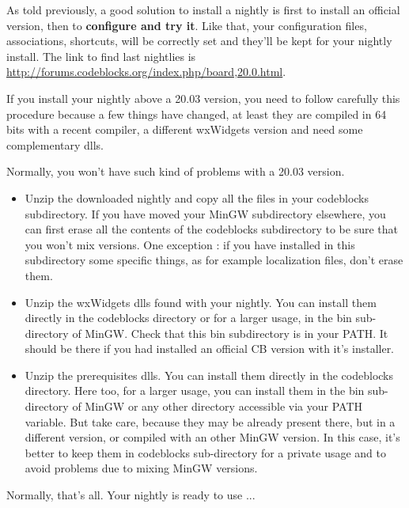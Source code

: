 As told previously, a good solution to install a nightly is first to install an official version, then to \textbf{configure and try it}. Like that, your configuration files, associations, shortcuts, will be correctly set and they'll be kept for your nightly install. The link to find last nightlies is \url{http://forums.codeblocks.org/index.php/board,20.0.html}.

If you install your nightly above a 20.03 version, you need to follow carefully this procedure because a few things have changed, at least they are compiled in 64 bits with a recent compiler, a different wxWidgets version and need some complementary dlls.

Normally, you won't have such kind of problems with a 20.03 version.
\begin{itemize}
\item Unzip the downloaded nightly and copy all the files in your codeblocks subdirectory. If you have moved your MinGW subdirectory elsewhere, you can first erase all the contents of the codeblocks subdirectory to be sure that you won't mix versions. One exception : if you have installed in this subdirectory some specific things, as for example localization files, don't erase them.
\item Unzip the wxWidgets dlls found with your nightly. You can install them directly in the codeblocks directory or for a larger usage, in the bin sub-directory of MinGW. Check that this bin subdirectory is in your PATH. It should be there if you had installed an official CB version with it's installer.
\item Unzip the prerequisites dlls. You can install them directly in the codeblocks directory. Here too, for a larger usage, you can install them in the bin sub-directory of MinGW or any other directory accessible via your PATH variable. But take care, because they may be already present there, but in a different version, or compiled with an other MinGW version. In this case, it's better to keep them in codeblocks sub-directory for a private usage and to avoid problems due to mixing MinGW versions.
\end{itemize}

Normally, that's all. Your nightly is ready to use ...
